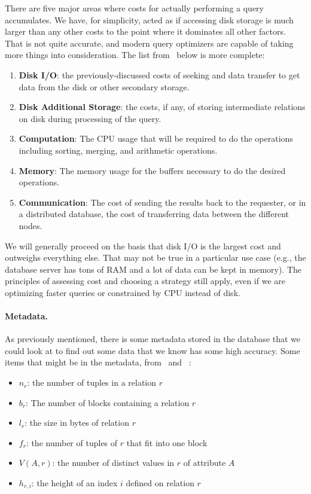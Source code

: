 \documentclass[a4paper]{report}
\begin{document}
There are five major areas where costs for actually performing a query accumulates. We have, for simplicity, acted as if accessing disk storage is much larger than any other costs to the point where it dominates all other factors. That is not quite accurate, and modern query optimizers are capable of taking more things into consideration. The list from~\cite{fds} below is more complete:

\begin{enumerate}
	\item \textbf{Disk I/O}: the previously-discussed costs of seeking and data transfer to get data from the disk or other secondary storage.
	\item \textbf{Disk Additional Storage}: the costs, if any, of storing intermediate relations on disk during processing of the query.
	\item \textbf{Computation}: The CPU usage that will be required to do the operations including sorting, merging, and arithmetic operations.
	\item \textbf{Memory}: The memory usage for the buffers necessary to do the desired operations.
	\item \textbf{Communication}: The cost of sending the results back to the requester, or in  a distributed database, the cost of transferring data between the different nodes.
\end{enumerate}

We will generally proceed on the basis that disk I/O is the largest cost and outweighs everything else. That may not be true in a particular use case (e.g., the database server has tons of RAM and a lot of data can be kept in memory). The principles of assessing cost and choosing a strategy still apply, even if we are optimizing faster queries or constrained by CPU instead of disk.

\paragraph{Metadata.} As previously mentioned, there is some metadata stored in the database that we could look at to find out some data that we know has some high accuracy. Some items that might be in the metadata, from~\cite{dsc} and ~\cite{fds}:

\begin{itemize}
	\item $n_{r}$: the number of tuples in a relation $r$ 
	\item $b_{r}$: The number of blocks containing a relation $r$ 
	\item $l_{r}$: the size in bytes of relation $r$
	\item $f_{r}$: the number of tuples of $r$ that fit into one block
	\item $V(A, r)$: the number of distinct values in $r$ of attribute $A$
	\item $h_{r, i}$: the height of an index $i$ defined on relation $r$
\end{itemize}
\end{document}
